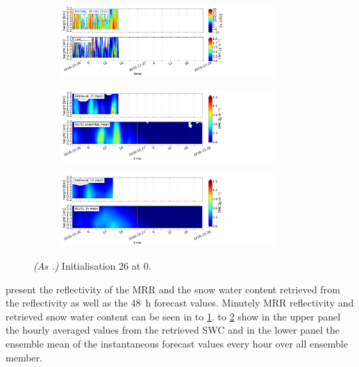 \begin{figure}[H]%
	\centering
	\begin{subfigure}[t]{1.05\textwidth}
		\centering
		\includegraphics[trim={0.cm 2.2cm 19.cm 0.5cm},clip,width=0.9\textwidth]{./fig_obs_ret/20161226}
		\caption{}\label{fig:SWC:ret_26}
	\end{subfigure}
	\begin{subfigure}[t]{1.05\textwidth}
		\centering
		\includegraphics[trim={0.cm 2.2cm 19.cm 0.5cm},clip,width=0.9\textwidth]{./fig_vert_SWC_EM/20161226}
		\caption{}\label{fig:SWC_EM:26}
	\end{subfigure}
	\begin{subfigure}[t]{1.05\textwidth}
		\centering
		\includegraphics[trim={0.cm 0.8cm 19.cm 0.5cm},clip,width=0.9\textwidth]{./fig_vert_SWC_3h/20161226}
		\caption{}\label{fig:SWC3h:26}
	\end{subfigure}
	\caption{\textit{(As .)} Initialisation \SI{26}{\dec} at \SI{0}{\UTC}.}\label{fig:SWC26}
\end{figure}
\noindent
{} present the reflectivity of the MRR and the snow water content retrieved from the reflectivity as well as the \SI{48}{\hour} forecast values. Minutely MRR reflectivity and retrieved snow water content can be seen in  to \ref{fig:SWC:ret_26}.  to \ref{fig:SWC_EM:26} show in the upper panel the hourly averaged values from the retrieved SWC and in the lower panel the ensemble mean of the instantaneous forecast values every hour over all ensemble member.   
